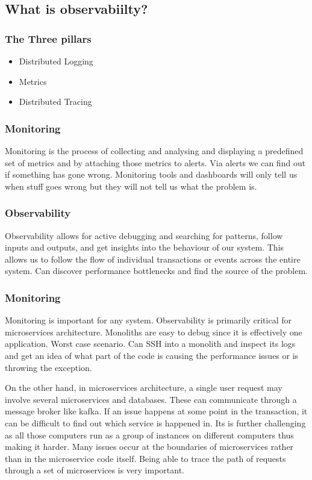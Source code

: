 \documentclass[a4paper, 11pt]{book}
\begin{document}
    \subsection{What is observabiilty?}

    \subsubsection{The Three pillars}

    \begin{itemize}
        \item Distributed Logging
        \item Metrics
        \item Distributed Tracing
    \end{itemize}

    \subsubsection{Monitoring}
    Monitoring is the process of collecting and analysing and displaying a predefined set of metrics and by attaching those metrics to alerts.
    Via alerts we can find out if something has gone wrong.
    Monitoring tools and dashboards will only tell us when stuff goes wrong but they will not tell us what the problem is.

    \subsubsection{Observability}
    Observability allows for active debugging and searching for patterns, follow inputs and outputs, and get insights into the behaviour of our system.
    This allows us to follow the flow of individual transactions or events across the entire system.
    Can discover performance bottlenecks and find the source of the problem.

    \subsubsection{Monitoring}
    Monitoring is important for any system.
    Observability is primarily critical for microservices architecture.
    Monoliths are easy to debug since it is effectively one application.
    Worst case scenario.
    Can SSH into a monolith and inspect its logs and get an idea of what part of the code is causing the performance issues or is throwing the exception.

    On the other hand, in microservices architecture, a single user request may involve several microservices and databases.
    These can communicate through a message broker like kafka.
    If an issue happens at some point in the transaction, it can be difficult to find out which service is happened in.
    Its is further challenging as all those computers run as a group of instances on different computers thus making it harder.
    Many issues occur at the boundaries of microservices rather than in the microservice code itself.
    Being able to trace the path of requests through a set of microservices is very important.
\end{document}
